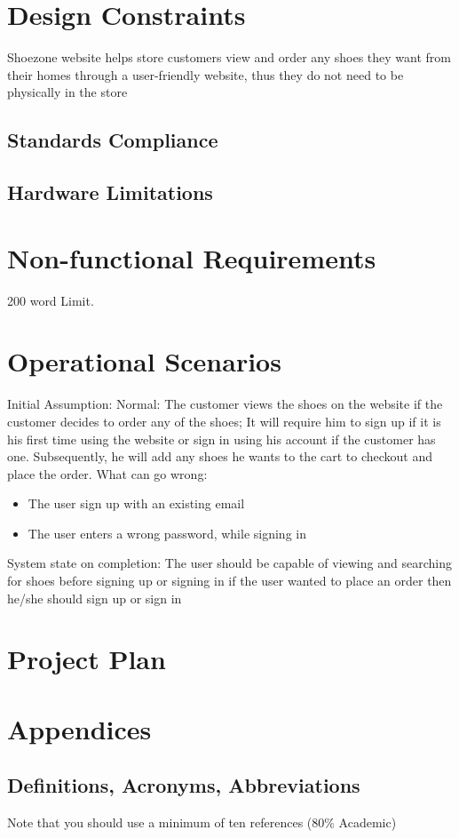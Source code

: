 \documentclass[12pt]{article}
\begin{document}
\section{Design Constraints}
Shoezone website helps store customers view and order any shoes they want from their homes through a user-friendly website, thus they do not need to be physically in the store 

\subsection{ Standards Compliance}

\subsection{ Hardware Limitations}


\section{Non-functional Requirements}
200 word Limit.





\section{Operational Scenarios}
Initial Assumption: 
Normal: The customer views the shoes on the website if the customer decides to order any of the shoes; It will require him to sign up if it is his first time using the website or sign in using his account if the customer has one. Subsequently, he will add any shoes he wants to the cart to checkout and place the order.
What can go wrong:

\begin{itemize}
\item The user sign up with an existing email
\item The user enters a wrong password, while signing in
\end{itemize}
System state on completion: The user should be capable of viewing and searching for shoes before signing up or signing in if the user wanted to place an order then he/she should sign up or sign in 
\section{Project Plan}


\section{Appendices}

\subsection{Definitions, Acronyms, Abbreviations}


\printbibliography
Note that you should use a minimum of ten references (80\% Academic)
\end{document}
